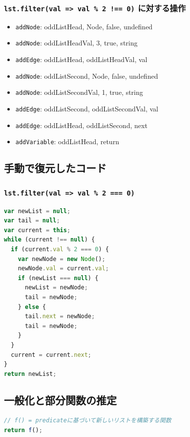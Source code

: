 \documentclass{article}
\begin{document}
\subsubsection{\texttt{lst.filter(val => val \% 2 !== 0)} に対する操作}
\begin{itemize}
  \item \texttt{addNode}: oddListHead, Node, false, undefined
  \item \texttt{addNode}: oddListHeadVal, 3, true, string
  \item \texttt{addEdge}: oddListHead, oddListHeadVal, val
  \item \texttt{addNode}: oddListSecond, Node, false, undefined
  \item \texttt{addNode}: oddListSecondVal, 1, true, string
  \item \texttt{addEdge}: oddListSecond, oddListSecondVal, val
  \item \texttt{addEdge}: oddListHead, oddListSecond, next
  \item \texttt{addVariable}: oddListHead, return
\end{itemize}

\subsection{手動で復元したコード}

\subsubsection{\texttt{lst.filter(val => val \% 2 === 0)}}
\begin{lstlisting}[language=JavaScript]
var newList = null;
var tail = null;
var current = this;
while (current !== null) {
  if (current.val % 2 === 0) {
    var newNode = new Node();
    newNode.val = current.val;
    if (newList === null) {
      newList = newNode;
      tail = newNode;
    } else {
      tail.next = newNode;
      tail = newNode;
    }
  }
  current = current.next;
}
return newList;
\end{lstlisting}

\subsection{一般化と部分関数の推定}

\begin{lstlisting}[language=JavaScript]
// f() = predicateに基づいて新しいリストを構築する関数
return f();
\end{lstlisting}
\end{document}
